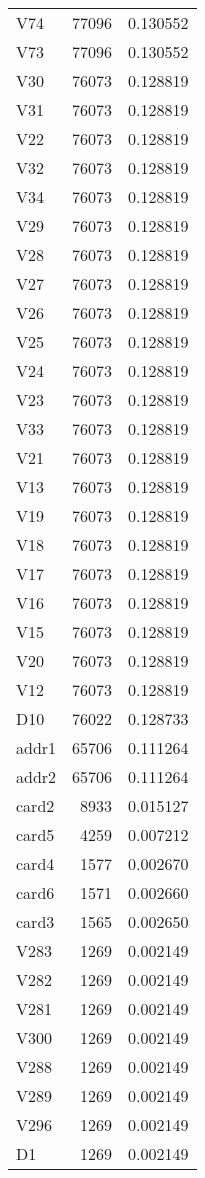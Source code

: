 \begin{tabular}{lrr}
V74 & 77096 & 0.130552 \\
V73 & 77096 & 0.130552 \\
V30 & 76073 & 0.128819 \\
V31 & 76073 & 0.128819 \\
V22 & 76073 & 0.128819 \\
V32 & 76073 & 0.128819 \\
V34 & 76073 & 0.128819 \\
V29 & 76073 & 0.128819 \\
V28 & 76073 & 0.128819 \\
V27 & 76073 & 0.128819 \\
V26 & 76073 & 0.128819 \\
V25 & 76073 & 0.128819 \\
V24 & 76073 & 0.128819 \\
V23 & 76073 & 0.128819 \\
V33 & 76073 & 0.128819 \\
V21 & 76073 & 0.128819 \\
V13 & 76073 & 0.128819 \\
V19 & 76073 & 0.128819 \\
V18 & 76073 & 0.128819 \\
V17 & 76073 & 0.128819 \\
V16 & 76073 & 0.128819 \\
V15 & 76073 & 0.128819 \\
V20 & 76073 & 0.128819 \\
V12 & 76073 & 0.128819 \\
D10 & 76022 & 0.128733 \\
addr1 & 65706 & 0.111264 \\
addr2 & 65706 & 0.111264 \\
card2 & 8933 & 0.015127 \\
card5 & 4259 & 0.007212 \\
card4 & 1577 & 0.002670 \\
card6 & 1571 & 0.002660 \\
card3 & 1565 & 0.002650 \\
V283 & 1269 & 0.002149 \\
V282 & 1269 & 0.002149 \\
V281 & 1269 & 0.002149 \\
V300 & 1269 & 0.002149 \\
V288 & 1269 & 0.002149 \\
V289 & 1269 & 0.002149 \\
V296 & 1269 & 0.002149 \\
D1 & 1269 & 0.002149 \\

\end{tabular}
